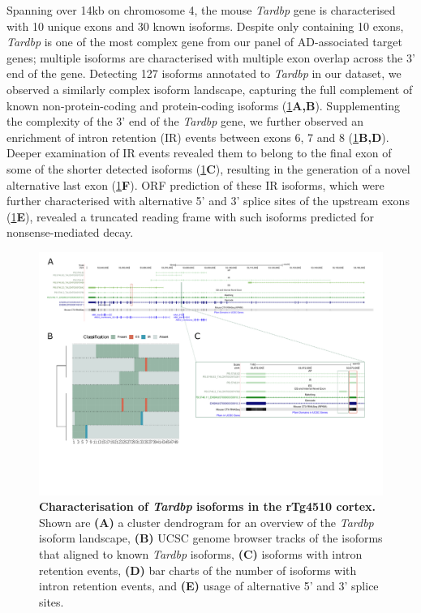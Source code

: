 Spanning over 14kb on chromosome 4, the mouse \textit{Tardbp} gene is characterised with 10 unique exons and 30 known isoforms. Despite only containing 10 exons, \textit{Tardbp} is one of the most complex gene from our panel of AD-associated target genes; multiple isoforms are characterised with multiple exon overlap across the 3' end of the gene. Detecting 127 isoforms annotated to \textit{Tardbp} in our dataset, we observed a similarly complex isoform landscape, capturing the full complement of known non-protein-coding and protein-coding isoforms (\cref{fig:tardbp}\textbf{A,B}). Supplementing the complexity of the 3' end of the \textit{Tardbp} gene, we further observed an enrichment of intron retention (IR) events between exons 6, 7 and 8 (\cref{fig:tardbp}\textbf{B,D}). Deeper examination of IR events revealed them to belong to the final exon of some of the shorter detected isoforms (\cref{fig:tardbp}\textbf{C}), resulting in the generation of a novel alternative last exon (\cref{fig:tardbp}\textbf{F}). ORF prediction of these IR isoforms, which were further characterised with alternative 5' and 3' splice sites of the upstream exons (\cref{fig:tardbp}\textbf{E}), revealed a truncated reading frame with such isoforms predicted for nonsense-mediated decay. 


\begin{landscape}
	\begin{figure}[htp]
		\centering
		\captionsetup{width=1.3\textwidth}
		\includegraphics[page=11,trim={0 1cm 0 0},scale = 0.8]{Figures/TargetGenes_Annotation_Landscape.pdf}
		\caption[Characterisation of the \textit{Tardbp} isoform landscape]%
		{\textbf{Characterisation of \textit{Tardbp} isoforms in the rTg4510 cortex.} Shown are \textbf{(A)} a cluster dendrogram for an overview of the \textit{Tardbp} isoform landscape, \textbf{(B)} UCSC genome browser tracks of the isoforms that aligned to known \textit{Tardbp} isoforms, \textbf{(C)} isoforms with intron retention events, \textbf{(D)} bar charts of the number of isoforms with intron retention events, and \textbf{(E)} usage of alternative 5' and 3' splice sites.}    
		\label{fig:tardbp}
	\end{figure}
\end{landscape}
\restoregeometry

